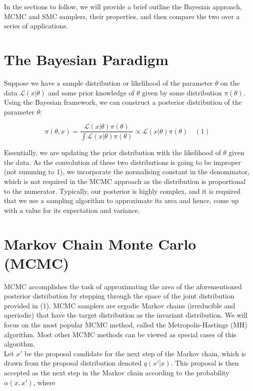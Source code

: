 \documentclass[12pt]{elsarticle}
\begin{document}
In the sections to follow, we will provide a brief outline the Bayesian approach, MCMC and SMC samplers, their properties, and then compare the two over a series of applications.

\section*{The Bayesian Paradigm}

Suppose we have a sample distribution or likelihood of the parameter $\theta$ on the data $\mathcal{L}(x|\theta)$ and some prior knowledge of $\theta$ given by some distribution $\pi(\theta)$. Using the Bayesian framework, we can construct a posterior distribution of the parameter $\theta$:

\[ 
\pi(\theta, x) = \frac{\mathcal{L}(x|\theta)\pi(\theta)}{\int \mathcal{L}(x|\theta)\pi(\theta)} \propto \mathcal{L}(x|\theta)\pi(\theta) \quad (1)
\]

Essentially, we are updating the prior distribution with the likelihood of $\theta$ given the data. As the convolution of these two distributions is going to be improper (not summing to 1), we incorporate the normalising constant in the denominator, which is not required in the MCMC approach as the distribution is proportional to the numerator. Typically, our posterior is highly complex, and it is required that we use a sampling algorithm to approximate its area and hence, come up with a value for its expectation and variance.

\section*{Markov Chain Monte Carlo (MCMC)}
MCMC accomplishes the task of approximating the area of the aforementioned posterior distribution by stepping through the space of the joint distribution provided in (1). MCMC samplers are ergodic Markov chains (irreducible and aperiodic) that have the target distribution as the invariant distribution.  We will focus on the most popular MCMC method, called the Metropolis-Hastings (MH) algorithm. Most other MCMC methods can be viewed as special cases of this algorithm. \\

Let $x'$ be the proposal candidate for the next step of the Markov chain, which is drawn from the proposal distribution denoted $q(x'|x)$. This proposal is then accepted as the next step in the Markov chain according to the probability $\alpha(x,x')$, where 
\end{document}

